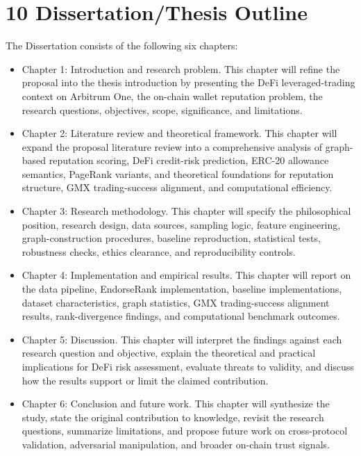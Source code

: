 \clearpage
{}
\section*{10 \textbf{Dissertation/Thesis Outline}}
\label{sec:dissertationthesis-outline}

The Dissertation consists of the following six chapters:


\begin{itemize}
\item[\textendash] Chapter 1: Introduction and research problem. This chapter will refine the proposal into the thesis introduction by presenting the DeFi leveraged-trading context on Arbitrum One, the on-chain wallet reputation problem, the research questions, objectives, scope, significance, and limitations.
\item[\textendash] Chapter 2: Literature review and theoretical framework. This chapter will expand the proposal literature review into a comprehensive analysis of graph-based reputation scoring, DeFi credit-risk prediction, ERC-20 allowance semantics, PageRank variants, and theoretical foundations for reputation structure, GMX trading-success alignment, and computational efficiency.
\item[\textendash] Chapter 3: Research methodology. This chapter will specify the philosophical position, research design, data sources, sampling logic, feature engineering, graph-construction procedures, baseline reproduction, statistical tests, robustness checks, ethics clearance, and reproducibility controls.
\item[\textendash] Chapter 4: Implementation and empirical results. This chapter will report on the data pipeline, EndorseRank implementation, baseline implementations, dataset characteristics, graph statistics, GMX trading-success alignment results, rank-divergence findings, and computational benchmark outcomes.
\item[\textendash] Chapter 5: Discussion. This chapter will interpret the findings against each research question and objective, explain the theoretical and practical implications for DeFi risk assessment, evaluate threats to validity, and discuss how the results support or limit the claimed contribution.
\item[\textendash] Chapter 6: Conclusion and future work. This chapter will synthesize the study, state the original contribution to knowledge, revisit the research questions, summarize limitations, and propose future work on cross-protocol validation, adversarial manipulation, and broader on-chain trust signals.
\end{itemize}
